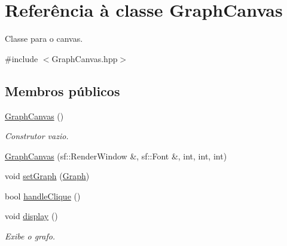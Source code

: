 \hypertarget{classGraphCanvas}{}\section{Referência à classe Graph\+Canvas}
\label{classGraphCanvas}


Classe para o canvas.  




{\ttfamily \#include $<$Graph\+Canvas.\+hpp$>$}

\subsection*{Membros públicos}
\begin{DoxyCompactItemize}
\item 
\mbox{\label{classGraphCanvas_a0868eb47bb561e5037b24dc06fad52c7}} 
\hyperlink{classGraphCanvas_a0868eb47bb561e5037b24dc06fad52c7}{Graph\+Canvas} ()
\begin{DoxyCompactList}\small\item\em Construtor vazio. \end{DoxyCompactList}\item 
\hyperlink{classGraphCanvas_a7852754f721735c6d8672673a50401cc}{Graph\+Canvas} (sf\+::\+Render\+Window \&, sf\+::\+Font \&, int, int, int)
\item 
void \hyperlink{classGraphCanvas_a1f402e85859d1eb3b6f1965de3def1af}{set\+Graph} (\hyperlink{classGraph}{Graph})
\item 
bool \hyperlink{classGraphCanvas_a4115aea20f2f1352b674ef9cfb6579a4}{handle\+Clique} ()
\item 
\mbox{\label{classGraphCanvas_a236523bfec7a55f8ea70c09fdb3590c3}} 
void \hyperlink{classGraphCanvas_a236523bfec7a55f8ea70c09fdb3590c3}{display} ()
\begin{DoxyCompactList}\small\item\em Exibe o grafo. \end{DoxyCompactList}\end{DoxyCompactItemize}
